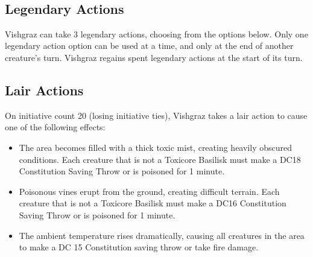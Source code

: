 \hfil\\\vspace*{4cm}
\subsection*{Legendary Actions}
Vishgraz can take 3 legendary actions, choosing from the options below. Only one legendary action option can be used at a time, and only at the end of another creature's turn. Vishgraz regains spent legendary actions at the start of its turn.
\begin{DndMonsterLegendaryActions}
\end{DndMonsterLegendaryActions}

\subsection*{Lair Actions}
On initiative count 20 (losing initiative ties), Vishgraz takes a lair action to cause one of the following effects:
\begin{itemize}
	\item The area becomes filled with a thick toxic mist, creating heavily obscured conditions. Each creature that is not a Toxicore Basilisk must make a DC18 Constitution Saving Throw or is poisoned for 1 minute.
	\item Poisonous vines erupt from the ground, creating difficult terrain. Each creature that is not a Toxicore Basilisk must make a DC16 Constitution Saving Throw or is poisoned for 1 minute.
	\item  The ambient temperature rises dramatically, causing all creatures in the area to make a DC 15 Constitution saving throw or take  fire damage.
\end{itemize}
